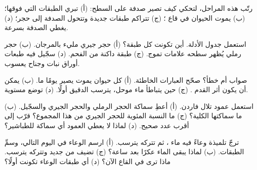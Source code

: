 \begin{exercise}[$\star$]\label{exo:g7:sediments-and-fossils:2}
رتّب هذه المراحل، لتحكي كيف تصير صدفة  على السطح: (أ) تبري 
الطبقات التي فوقها؛ (ب) يموت الحيوان في قاع ؛ (ج) تتراكم طبقات
جديدة وتتحول الصدفة إلى حجر؛ (د) يغطي  الصدفة بسرعة.
\end{exercise}

\begin{exercise}[$\star$]\label{exo:g7:sediments-and-fossils:3}
استعمل جدول الأدلة. أين تكونت كل طبقة؟ (أ) حجر جيري مليء بالمرجان. (ب)
حجر رملي يُظهر سطحه علامات تموج. (ج) طبقة داكنة من الفحم. (د) سجّيل فيه
طبعات أوراق نبات وجناح يعسوب.
\end{exercise}

\begin{exercise}[$\star$]\label{exo:g7:sediments-and-fossils:4}
صواب أم خطأ؟ صحّح العبارات الخاطئة. (أ) كل حيوان يموت يصير  يومًا
ما. (ب) يمكن أن يكون أثر القدم . (ج) حين يتباطأ ماء موحل، يترسب
 الدقيق أولًا. (د) توضع  مستوية.
\end{exercise}

\begin{exercise}[$\star\star$]\label{exo:g7:sediments-and-fossils:5}
استعمل عمود تلال فاردن. (أ) أعطِ سماكة الحجر الرملي والحجر الجيري
والسجّيل. (ب) ما سماكتها الكلية؟ (ج) ما النسبة المئوية للحجر الجيري من
هذا المجموع؟ قرّب إلى أقرب عدد صحيح. (د) لماذا لا يعطي العمود أي سماكة
للطباشير؟
\end{exercise}

\begin{exercise}[$\star\star$]\label{exo:g7:sediments-and-fossils:6}
ترجّ تلميذة وعاءً فيه ماء   ، ثم تتركه يترسب. (أ) ارسم
الوعاء في اليوم التالي، وسمِّ الطبقات. (ب) لماذا يبقى الماء عكرًا بعد
ساعة؟ (ج) تضيف   من جديد وتتركه يترسب. ماذا ترى في القاع
الآن؟ (د) أي طبقات الوعاء تكونت أولًا؟
\end{exercise}

